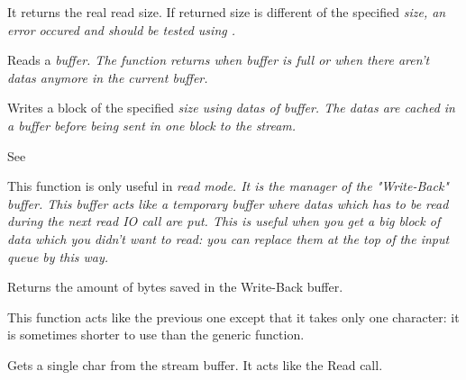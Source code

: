 
It returns the real read size. If returned size is different of the specified 
\it{size}, an error occured and should be tested using 
.




Reads a \it{buffer}. The function returns when \it{buffer} is full or
when there aren't datas anymore in the current buffer.



Writes a block of the specified \it{size} using datas of \it{buffer}. The datas
are cached in a buffer before being sent in one block to the stream.


See 

\label{wxstreambufwriteback}


This function is only useful in \it{read} mode. It is the manager of the "Write-Back"
buffer. This buffer acts like a temporary buffer where datas which has to be 
read during the next read IO call are put. This is useful when you get a big
block of data which you didn't want to read: you can replace them at the top
of the input queue by this way.


Returns the amount of bytes saved in the Write-Back buffer.


This function acts like the previous one except that it takes only one
character: it is sometimes shorter to use than the generic function.



Gets a single char from the stream buffer. It acts like the Read call.


